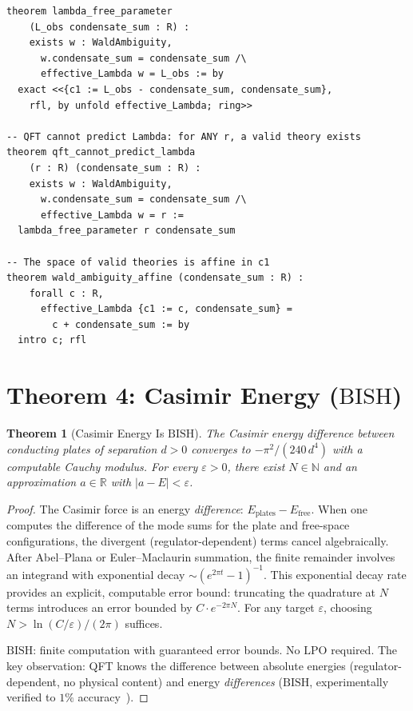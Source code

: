 \documentclass[11pt,a4paper]{article}
\theoremstyle{plain}
\newtheorem{theorem}{Theorem}[section]
\theoremstyle{definition}
\newcommand{\NN}{\mathbb{N}}
\newcommand{\RR}{\mathbb{R}}
\newcommand{\LPO}{\ensuremath{\mathrm{LPO}}}
\newcommand{\BISH}{\ensuremath{\mathrm{BISH}}}
\begin{document}
\begin{lstlisting}[caption={Wald ambiguity: \texttt{WaldAmbiguity.lean}}]
theorem lambda_free_parameter
    (L_obs condensate_sum : R) :
    exists w : WaldAmbiguity,
      w.condensate_sum = condensate_sum /\
      effective_Lambda w = L_obs := by
  exact <<{c1 := L_obs - condensate_sum, condensate_sum},
    rfl, by unfold effective_Lambda; ring>>

-- QFT cannot predict Lambda: for ANY r, a valid theory exists
theorem qft_cannot_predict_lambda
    (r : R) (condensate_sum : R) :
    exists w : WaldAmbiguity,
      w.condensate_sum = condensate_sum /\
      effective_Lambda w = r :=
  lambda_free_parameter r condensate_sum

-- The space of valid theories is affine in c1
theorem wald_ambiguity_affine (condensate_sum : R) :
    forall c : R,
      effective_Lambda {c1 := c, condensate_sum} =
        c + condensate_sum := by
  intro c; rfl
\end{lstlisting}

\section{Theorem 4: Casimir Energy ($\BISH$)}\label{sec:casimir}

\begin{theorem}[Casimir Energy Is $\BISH$]\label{thm:casimir}
The Casimir energy difference between conducting plates of
separation $d > 0$ converges to $-\pi^2/(240\,d^4)$ with a computable
Cauchy modulus.  For every $\varepsilon > 0$, there exist
$N \in \NN$ and an approximation $a \in \RR$ with $|a - E| < \varepsilon$.
\end{theorem}

\begin{proof}
The Casimir force is an energy \emph{difference}: $E_{\mathrm{plates}}
- E_{\mathrm{free}}$.  When one computes the difference of the
mode sums for the plate and free-space configurations, the divergent
(regulator-dependent) terms cancel algebraically.  After
Abel--Plana or Euler--Maclaurin summation, the finite remainder
involves an integrand with exponential decay
$\sim (e^{2\pi t} - 1)^{-1}$.  This exponential decay rate provides
an explicit, computable error bound: truncating the quadrature at
$N$ terms introduces an error bounded by $C \cdot e^{-2\pi N}$.
For any target $\varepsilon$, choosing $N > \ln(C/\varepsilon)/(2\pi)$
suffices.

$\BISH$: finite computation with guaranteed error bounds.
No $\LPO$ required.  The key observation: QFT knows the difference
between absolute energies (regulator-dependent, no physical content)
and energy \emph{differences} ($\BISH$, experimentally verified to
$1\%$ accuracy~\cite{Casimir1948}).
\end{proof}
\end{document}
